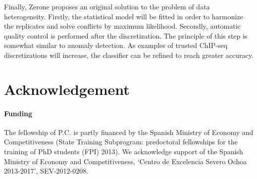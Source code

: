 \documentclass{bioinfo}
\begin{document}
Finally, Zerone proposes an original solution to the problem of
data heterogeneity. Firstly, the statistical model will be fitted
in order to harmonize the replicates and solve conflicts by maximum
likelihood. Secondly, automatic quality control is performed
after the discretization. The principle of this step is somewhat
similar to anomaly detection. As examples of trusted ChIP-seq
discretizations will increase, the classifier can be refined to
reach greater accuracy.

\section*{Acknowledgement}
\paragraph{Funding\textcolon}
The fellowship of P.C. is partly financed by the Spanish Ministry
of Economy and Competitiveness (State Training Subprogram: predoctoral
fellowships for the training of PhD students (FPI) 2013).
We acknowledge support of the Spanish Ministry of Economy and
Competitiveness, `Centro de Excelencia Severo Ochoa 2013-2017',
SEV-2012-0208.



\end{document}
